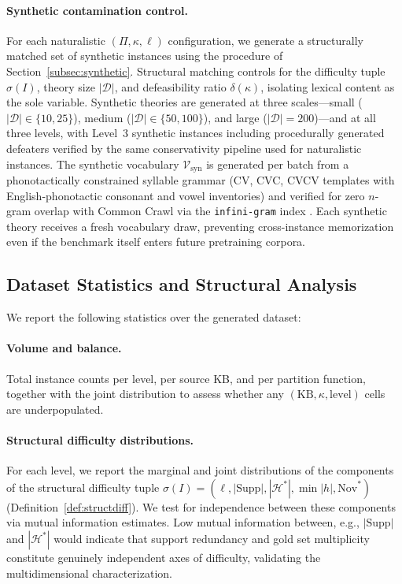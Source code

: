 \documentclass{article}
\theoremstyle{definition}
\newcommand{\D}{\mathcal{D}}
\newcommand{\Hgold}{\mathcal{H}^{*}}
\newcommand{\partfunc}{\kappa}
\newcommand{\Supp}{\mathrm{Supp}}
\newcommand{\Nov}{\mathrm{Nov}}
\begin{document}
\paragraph{Synthetic contamination control.} For each naturalistic $(\Pi, \partfunc, \ell)$ configuration, we generate a structurally matched set of synthetic instances using the procedure of Section~\ref{subsec:synthetic}. Structural matching controls for the difficulty tuple $\sigma(I)$, theory size $|\D|$, and defeasibility ratio $\delta(\partfunc)$, isolating lexical content as the sole variable. Synthetic theories are generated at three scales---small ($|\D| \in \{10, 25\}$), medium ($|\D| \in \{50, 100\}$), and large ($|\D| = 200$)---and at all three levels, with Level~3 synthetic instances including procedurally generated defeaters verified by the same conservativity pipeline used for naturalistic instances. The synthetic vocabulary $\mathcal{V}_{\mathrm{syn}}$ is generated per batch from a phonotactically constrained syllable grammar (CV, CVC, CVCV templates with English-phonotactic consonant and vowel inventories) and verified for zero $n$-gram overlap with Common Crawl via the \texttt{infini-gram} index \cite{liu2024infini}. Each synthetic theory receives a fresh vocabulary draw, preventing cross-instance memorization even if the benchmark itself enters future pretraining corpora.


\subsection{Dataset Statistics and Structural Analysis}\label{subsec:statistics}

We report the following statistics over the generated dataset:

\paragraph{Volume and balance.} Total instance counts per level, per source KB, and per partition function, together with the joint distribution to assess whether any $(\text{KB}, \partfunc, \text{level})$ cells are underpopulated.

\paragraph{Structural difficulty distributions.} For each level, we report the marginal and joint distributions of the components of the structural difficulty tuple $\sigma(I) = (\ell, |\Supp|, |\Hgold|, \min|h|, \Nov^*)$ (Definition~\ref{def:structdiff}). We test for independence between these components via mutual information estimates. Low mutual information between, e.g., $|\Supp|$ and $|\Hgold|$ would indicate that support redundancy and gold set multiplicity constitute genuinely independent axes of difficulty, validating the multidimensional characterization.
\end{document}
